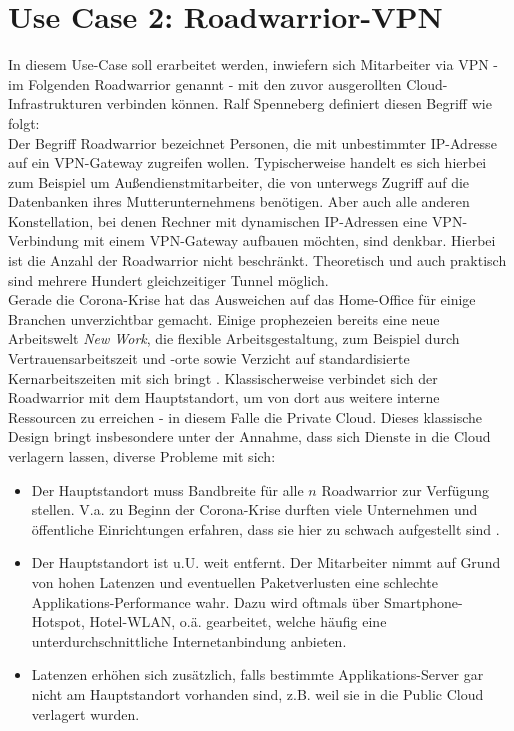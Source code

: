 \section{Use Case 2: \gls{Roadwarrior}-\gls{VPN}}
In diesem Use-Case soll erarbeitet werden, inwiefern sich Mitarbeiter via \gls{VPN} - im Folgenden \gls{Roadwarrior} genannt - mit den zuvor ausgerollten Cloud-Infrastrukturen verbinden können. Ralf Spenneberg definiert diesen Begriff wie folgt:\\
\glqq Der Begriff \gls{Roadwarrior} bezeichnet Personen, die mit unbestimmter IP-Adresse auf ein \gls{VPN-Gateway} zugreifen wollen. Typischerweise handelt es sich hierbei zum Beispiel um Außendienstmitarbeiter, die von unterwegs Zugriff auf die Datenbanken ihres Mutterunternehmens benötigen. Aber auch alle anderen Konstellation, bei denen Rechner mit dynamischen IP-Adressen eine \gls{VPN}-Verbindung mit einem \gls{VPN-Gateway} aufbauen möchten, sind denkbar. Hierbei ist die Anzahl der \gls{Roadwarrior} nicht beschränkt. Theoretisch und auch praktisch sind mehrere Hundert gleichzeitiger Tunnel möglich.\grqq{} \cite[S. 199]{Spenneberg2010}\\
Gerade die Corona-Krise hat das Ausweichen auf das Home-Office für einige Branchen unverzichtbar gemacht. Einige prophezeien bereits eine neue Arbeitswelt \textit{New Work}, die \glqq flexible Arbeitsgestaltung, zum Beispiel durch Vertrauensarbeitszeit und -orte sowie Verzicht auf standardisierte Kernarbeitszeiten\grqq{} mit sich bringt \cite{Umbs2020}.
Klassischerweise verbindet sich der \gls{Roadwarrior} mit dem Hauptstandort, um von dort aus weitere interne Ressourcen zu erreichen - in diesem Falle die Private Cloud. Dieses klassische Design bringt insbesondere unter der Annahme, dass sich Dienste in die Cloud verlagern lassen, diverse Probleme mit sich:
\begin{itemize}
\item Der Hauptstandort muss Bandbreite für alle $n$ \gls{Roadwarrior} zur Verfügung stellen. V.a. zu Beginn der Corona-Krise durften viele Unternehmen und öffentliche Einrichtungen erfahren, dass sie hier zu schwach aufgestellt sind \cite{tufreiberg2021}.
\item Der Hauptstandort ist u.U. weit entfernt. Der Mitarbeiter nimmt auf Grund von hohen Latenzen und eventuellen Paketverlusten eine schlechte Applikations-Performance wahr. Dazu wird oftmals über Smartphone-Hotspot, Hotel-WLAN, o.ä. gearbeitet, welche häufig eine unterdurchschnittliche Internetanbindung anbieten.
\item Latenzen erhöhen sich zusätzlich, falls bestimmte Applikations-Server gar nicht am Hauptstandort vorhanden sind, z.B. weil sie in die Public Cloud verlagert wurden.
\end{itemize}
